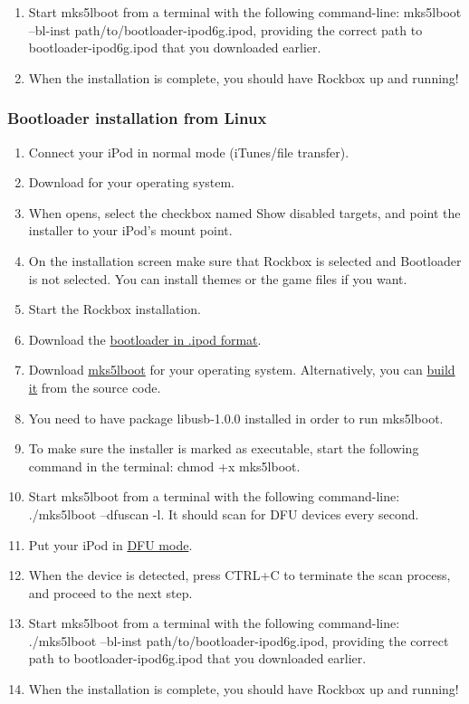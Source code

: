 {\begin{enumerate}
\item Start mks5lboot from a terminal with the following command-line:
mks5lboot --bl-inst path/to/bootloader-ipod6g.ipod, providing the
correct path to bootloader-ipod6g.ipod that you downloaded earlier.

\item When the installation is complete, you should have Rockbox up and
running!

\end{enumerate}

\subsubsection{Bootloader installation from Linux}

\begin{enumerate}

\item Connect your iPod in normal mode (iTunes/file transfer).
\item Download  for your operating system.
\item When  opens, select the checkbox named Show disabled targets, and point the installer to your iPod's mount point.
\item On the installation screen make sure that Rockbox is selected and Bootloader is not selected. You can install themes or the game files if you want.
\item Start the Rockbox installation.
\item Download the \href{https://files.freemyipod.org/~user890104/bootloader-ipodclassic-v1_0/bootloader-ipod6g.ipod}{bootloader in .ipod format}.
\item Download \href{https://files.freemyipod.org/~user890104/bootloader-ipodclassic.html#download_stable}{mks5lboot} for your operating system. Alternatively, you can \href{https://files.freemyipod.org/~user890104/bootloader-ipodclassic.html#build_mks5lboot}{build it} from the source code.
\item You need to have package libusb-1.0.0 installed in order to run mks5lboot.
\item To make sure the installer is marked as executable, start the following command in the terminal: chmod +x mks5lboot.
\item Start mks5lboot from a terminal with the following command-line: ./mks5lboot --dfuscan -l. It should scan for DFU devices every second.
\item Put your iPod in \href{https://files.freemyipod.org/~user890104/bootloader-ipodclassic.html#dfu}{DFU mode}.
\item When the device is detected, press CTRL+C to terminate the scan process, and proceed to the next step.
\item Start mks5lboot from a terminal with the following command-line: ./mks5lboot --bl-inst path/to/bootloader-ipod6g.ipod, providing the correct path to bootloader-ipod6g.ipod that you downloaded earlier.
\item When the installation is complete, you should have Rockbox up and running!

\end{enumerate}
}
